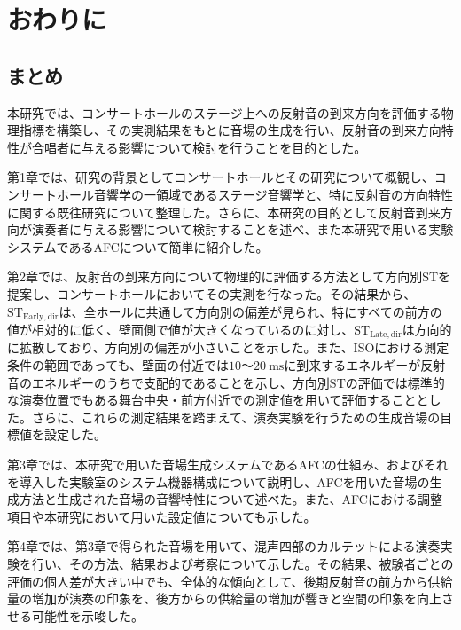 \documentclass[11pt,a4j]{jreport}
\begin{document}
\chapter{おわりに}

\section{まとめ}
本研究では、コンサートホールのステージ上への反射音の到来方向を評価する物理指標を構築し、その実測結果をもとに音場の生成を行い、反射音の到来方向特性が合唱者に与える影響について検討を行うことを目的とした。

第1章では、研究の背景としてコンサートホールとその研究について概観し、コンサートホール音響学の一領域であるステージ音響学と、特に反射音の方向特性に関する既往研究について整理した。さらに、本研究の目的として反射音到来方向が演奏者に与える影響について検討することを述べ、また本研究で用いる実験システムであるAFCについて簡単に紹介した。

第2章では、反射音の到来方向について物理的に評価する方法として方向別STを提案し、コンサートホールにおいてその実測を行なった。その結果から、$\mathrm{ST_{Early,dir}}$は、全ホールに共通して方向別の偏差が見られ、特にすべての前方の値が相対的に低く、壁面側で値が大きくなっているのに対し、$\mathrm{ST_{Late,dir}}$は方向的に拡散しており、方向別の偏差が小さいことを示した。また、ISOにおける測定条件の範囲であっても、壁面の付近では$10$〜$\SI{20}{\ms}$に到来するエネルギーが反射音のエネルギーのうちで支配的であることを示し、方向別STの評価では標準的な演奏位置でもある舞台中央・前方付近での測定値を用いて評価することとした。さらに、これらの測定結果を踏まえて、演奏実験を行うための生成音場の目標値を設定した。

第3章では、本研究で用いた音場生成システムであるAFCの仕組み、およびそれを導入した実験室のシステム機器構成について説明し、AFCを用いた音場の生成方法と生成された音場の音響特性について述べた。また、AFCにおける調整項目や本研究において用いた設定値についても示した。

第4章では、第3章で得られた音場を用いて、混声四部のカルテットによる演奏実験を行い、その方法、結果および考察について示した。その結果、被験者ごとの評価の個人差が大きい中でも、全体的な傾向として、後期反射音の前方から供給量の増加が演奏の印象を、後方からの供給量の増加が響きと空間の印象を向上させる可能性を示唆した。

\end{document}

